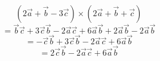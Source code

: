 \documentclass{article}
\begin{document}
\[ (2\vec{a} + \vec{b} - 3\vec{c}) \times (2\vec{a} + \vec{b} + \vec{c}) \]
\[ = \vec{b}\vec{c} + 3\vec{c}\vec{b} - 2\vec{a}\vec{c} + 6\vec{a}\vec{b} + 2\vec{a}\vec{b} - 2\vec{a}\vec{b} \]
\[ = -\vec{c}\vec{b} + 3\vec{c}\vec{b} - 2\vec{a}\vec{c} + 6\vec{a}\vec{b} \]
\[ = 2\vec{c}\vec{b} - 2\vec{a}\vec{c} + 6\vec{a}\vec{b} \]
\end{document}
